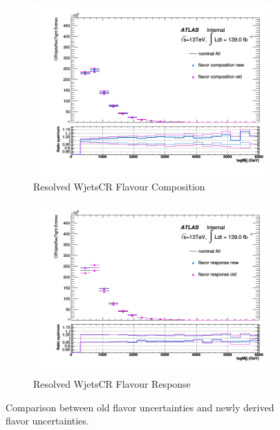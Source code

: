 \begin{figure}[ht]
    \bigskip %

    \begin{subfigure}[b]{0.4\textwidth}
        \centering
        \includegraphics[width=\textwidth]{figures/1lep/FlavorVar/SystFCompCRVjetsResTight_All_tagMjj.png}
        \caption{Resolved WjetsCR Flavour Composition}
        \label{fig:ResolvedWjetsCRFlavourComposition}
    \end{subfigure}
    \quad %
    \begin{subfigure}[b]{0.4\textwidth}
        \centering
        \includegraphics[width=\textwidth]{figures/1lep/FlavorVar/SystFResCRVjetsResTight_All_tagMjj.png}
        \caption{Resolved WjetsCR Flavour Response}
        \label{fig:ResolvedWjetsCRFlavourResponse}
    \end{subfigure}

    \caption{Comparison between old flavor uncertainties and newly derived flavor uncertainties.}
    \label{fig:1LepFlavorVarOldNew}
\end{figure}
